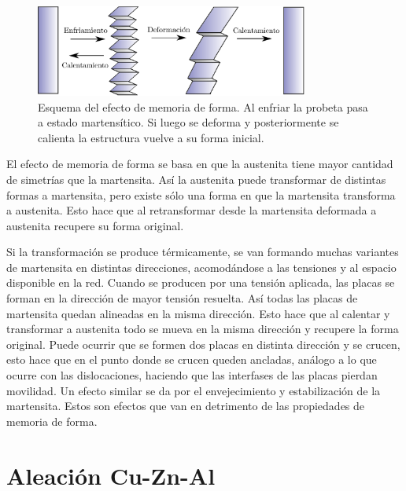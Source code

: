 \documentclass[a4paper,12pt,fleqn,twoside,openany]{book}
\begin{document}
\begin{figure}[h]
 \centering
 \includegraphics[width=0.8\textwidth]{memoria.eps}
 \caption{Esquema del efecto de memoria de forma. Al enfriar la probeta pasa a estado martensítico. Si luego se deforma y posteriormente se calienta
 la estructura vuelve a su forma inicial.} 
 \label{fig:memoria}
 \end{figure}


El efecto de memoria de forma se basa en que la 
austenita tiene mayor cantidad de simetrías que la martensita. Así la austenita puede transformar de distintas formas a martensita, pero existe sólo 
una forma en que la martensita transforma a austenita. Esto hace que al retransformar desde la martensita deformada a austenita recupere su forma 
original.

Si la transformación se produce térmicamente, se van formando muchas variantes de martensita en distintas 
direcciones, acomodándose a las tensiones y al espacio disponible en la red. Cuando se producen por una tensión aplicada, las placas se forman en la dirección de mayor tensión resuelta. Así todas las placas de martensita quedan alineadas en la misma dirección. Esto hace que al calentar y 
transformar a austenita todo se mueva en la misma dirección y recupere la forma original. Puede ocurrir que se formen dos placas en distinta dirección 
y se crucen, esto hace que en el punto donde se crucen queden ancladas, análogo a lo que ocurre con las dislocaciones, haciendo que las interfases de las placas pierdan movilidad. Un efecto similar se da por el envejecimiento y estabilización de la martensita. Estos son efectos que van en detrimento de las propiedades de memoria de forma.


\section{Aleación Cu-Zn-Al}
\end{document}
